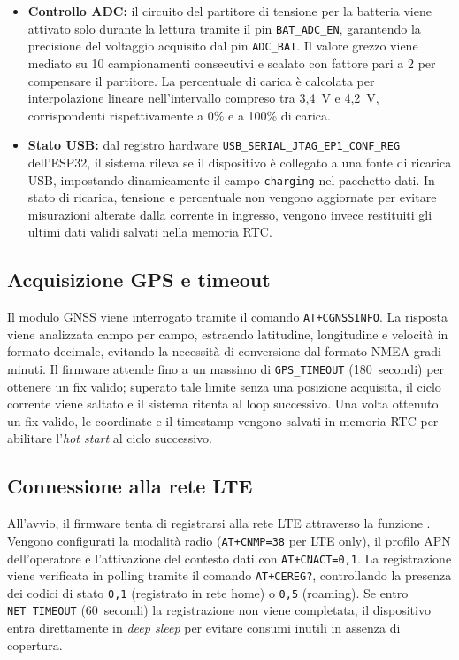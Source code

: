\documentclass[12pt,a4paper]{article}
\begin{document}
\begin{itemize}
    \item \textbf{Controllo ADC:} il circuito del partitore di tensione per la batteria viene
          attivato solo durante la lettura tramite il pin \texttt{BAT\_ADC\_EN}, garantendo la
          precisione del voltaggio acquisito dal pin \texttt{ADC\_BAT}. Il valore grezzo viene
          mediato su 10 campionamenti consecutivi e scalato con fattore pari a 2 per compensare il partitore. 
          La percentuale di carica è calcolata per interpolazione lineare
          nell'intervallo compreso tra 3,4~V e 4,2~V,
          corrispondenti rispettivamente a 0\% e a 100\% di carica.
    \item \textbf{Stato USB:} dal registro hardware \texttt{USB\_SERIAL\_JTAG\_\allowbreak EP1\_CONF\_REG} dell'ESP32, 
          il sistema rileva se il dispositivo è collegato a una fonte di ricarica USB, impostando
          dinamicamente il campo \texttt{charging} nel pacchetto dati. In stato di ricarica,
          tensione e percentuale non vengono aggiornate per evitare misurazioni alterate dalla
          corrente in ingresso, vengono invece restituiti gli ultimi dati validi salvati nella memoria RTC.
\end{itemize}

\subsection{Acquisizione GPS e timeout}

Il modulo GNSS viene interrogato tramite il comando \texttt{AT+CGNSSINFO}.
La risposta viene analizzata campo per campo, estraendo latitudine, longitudine e velocità
in formato decimale, evitando la necessità di conversione dal formato NMEA gradi-minuti.
Il firmware attende fino a un massimo di \texttt{GPS\_TIMEOUT} (180~secondi) per ottenere
un fix valido; superato tale limite senza una posizione acquisita, il ciclo corrente viene
saltato e il sistema ritenta al loop successivo. Una volta ottenuto un fix valido, le
coordinate e il timestamp vengono salvati in memoria RTC per abilitare l'\textit{hot start} al
ciclo successivo.

\subsection{Connessione alla rete LTE}

All'avvio, il firmware tenta di registrarsi alla rete LTE attraverso la funzione
. Vengono configurati la modalità radio
(\texttt{AT+CNMP=38} per LTE only), il profilo APN dell'operatore e l'attivazione del
contesto dati con \texttt{AT+CNACT=0,1}. La registrazione viene verificata in polling
tramite il comando \texttt{AT+CEREG?}, controllando la presenza dei codici di stato
\texttt{0,1} (registrato in rete home) o \texttt{0,5} (roaming). Se entro
\texttt{NET\_TIMEOUT} (60~secondi) la registrazione non viene completata, il dispositivo
entra direttamente in \textit{deep sleep} per evitare consumi inutili in assenza di copertura.
\end{document}
